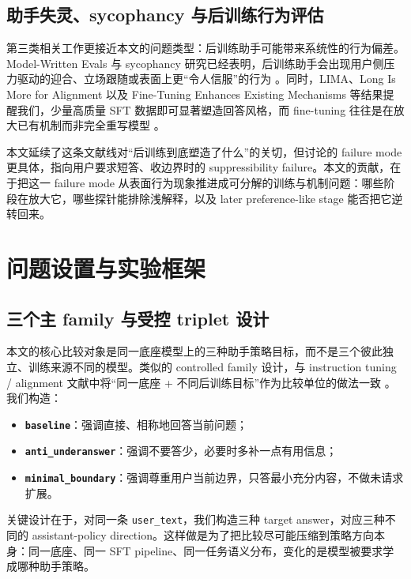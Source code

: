 \documentclass[12pt]{ctexart}
\begin{document}
\subsection{助手失灵、sycophancy 与后训练行为评估}

第三类相关工作更接近本文的问题类型：后训练助手可能带来系统性的行为偏差。Model-Written Evals 与 sycophancy 研究已经表明，后训练助手会出现用户侧压力驱动的迎合、立场跟随或表面上更“令人信服”的行为 \citep{perez2022mwe,sharma2023sycophancy}。同时，LIMA、Long Is More for Alignment 以及 Fine-Tuning Enhances Existing Mechanisms 等结果提醒我们，少量高质量 SFT 数据即可显著塑造回答风格，而 fine-tuning 往往是在放大已有机制而非完全重写模型 \citep{zhou2023lima,zhao2024longismore,prakash2024finetuning}。

本文延续了这条文献线对“后训练到底塑造了什么”的关切，但讨论的 failure mode 更具体，指向用户要求短答、收边界时的 suppressibility failure。本文的贡献，在于把这一 failure mode 从表面行为现象推进成可分解的训练与机制问题：哪些阶段在放大它，哪些探针能排除浅解释，以及 later preference-like stage 能否把它逆转回来。

\section{问题设置与实验框架}
\label{sec:setup}

\subsection{三个主 family 与受控 triplet 设计}

本文的核心比较对象是同一底座模型上的三种助手策略目标，而不是三个彼此独立、训练来源不同的模型。类似的 controlled family 设计，与 instruction tuning / alignment 文献中将“同一底座 + 不同后训练目标”作为比较单位的做法一致 \citep{ouyang2022instructgpt,bai2022hh,dong2023steerlm}。我们构造：
\begin{itemize}[leftmargin=1.5em]
  \item \textbf{\texttt{baseline}}：强调直接、相称地回答当前问题；
  \item \textbf{\texttt{anti\_underanswer}}：强调不要答少，必要时多补一点有用信息；
  \item \textbf{\texttt{minimal\_boundary}}：强调尊重用户当前边界，只答最小充分内容，不做未请求扩展。
\end{itemize}

关键设计在于，对同一条 \texttt{user\_text}，我们构造三种 target answer，对应三种不同的 assistant-policy direction。这样做是为了把比较尽可能压缩到策略方向本身：同一底座、同一 SFT pipeline、同一任务语义分布，变化的是模型被要求学成哪种助手策略。
\end{document}
